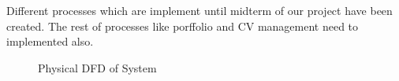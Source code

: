 Different processes which are implement until midterm of our project have been created. The rest of processes like porffolio and CV management need to implemented also.
\begin{figure}[H]
  \caption{Physical DFD of System}
\end{figure}
\newpage
